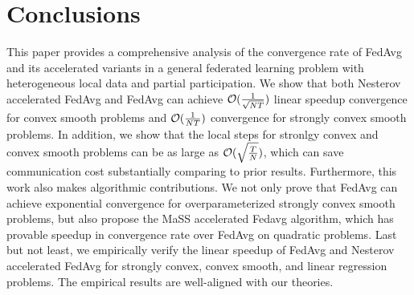 
\section{Conclusions}
This paper provides a comprehensive analysis of the convergence rate of FedAvg
and its accelerated variants in a general federated learning problem with heterogeneous local data and partial participation. We show that both Nesterov accelerated FedAvg and FedAvg
can achieve {\small{${\mathcal{O}}(\frac{1}{\sqrt{NT}})$}} linear speedup convergence for convex smooth problems and {\small{${\mathcal{O}}(\frac{1}{NT})$}} convergence for strongly 
convex smooth problems. In addition, we show that the local steps for stronlgy convex and convex smooth problems can be as large as {\small{${\mathcal{O}}(\sqrt{\frac{T}{N}})$}}, which can save communication cost substantially comparing to prior results. 
Furthermore, this work also makes algorithmic contributions. We not only prove that FedAvg can achieve exponential convergence for overparameterized strongly convex smooth problems, but also propose the MaSS accelerated Fedavg algorithm, which has provable speedup in convergence rate over FedAvg on quadratic problems. Last but not least, we empirically
verify the linear speedup of FedAvg and Nesterov accelerated FedAvg for strongly convex, convex smooth, and linear regression problems. The empirical results are well-aligned with our theories. 